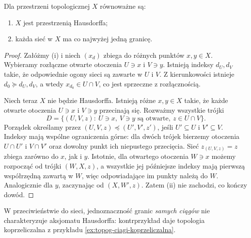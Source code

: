 \begin{twierdzenie}
\label{thm:topog-sieci-hausdorff}
Dla przestrzeni topologicznej $X$ równoważne są:
\begin{enumerate}[label=(\roman*)]
\item $X$ jest przestrzenią Hausdorffa;
\item każda sieć w $X$ ma co najwyżej jedną granicę.
\end{enumerate}
\end{twierdzenie}
\begin{proof}
Załóżmy (i) i niech $(x_d)$ zbiega do różnych
punktów $x,y\in X$. Wybieramy rozłączne otwarte
otoczenia $U\ni x$ i $V\ni y$. Istnieją indeksy
$d_U,d_V$ takie, że odpowiednie ogony sieci są
zawarte w $U$ i $V$. Z kierunkowości istnieje
$d_0\succeq d_U,d_V$, a wtedy $x_{d_0}\in U\cap V$,
co jest sprzeczne z rozłącznością.

Niech teraz $X$ nie będzie Hausdorffa. Istnieją różne
$x,y\in X$ takie, że każde otwarte otoczenia
$U\ni x$ i $V\ni y$ przecinają się.
Rozważmy wszystkie trójki
\[
 D=\{(U,V,z):\ U\ni x,\ V\ni y\text{ są otwarte},
                                 \ z\in U\cap V\}.
\]
Porządek określamy przez
$(U,V,z)\preceq(U',V',z')$, jeśli
$U'\subseteq U$ i $V'\subseteq V$.
Indeksy mają wspólne ograniczenia górne: dla dwóch
trójek bierzemy otoczenia $U\cap U'$ i $V\cap V'$
oraz dowolny punkt ich niepustego przecięcia.
Sieć $z_{(U,V,z)}=z$ zbiega zarówno do $x$, jak i $y$.
Istotnie, dla otwartego otoczenia $W\ni x$
możemy rozpocząć od trójki $(W,X,z)$,
a wszystkie jej późniejsze indeksy mają pierwszą
współrzędną zawartą w $W$, więc odpowiadające im
punkty należą do $W$. Analogicznie dla $y$,
zaczynając od $(X,W',z)$.
Zatem (ii) nie zachodzi, co kończy dowód.
\end{proof}

\begin{uwaga}
W przeciwieństwie do sieci, jednoznaczność granic
\emph{samych ciągów} nie charakteryzuje aksjomatu
Hausdorffa: kontrprzykład daje topologia koprzeliczalna
z przykładu \ref{ex:topog-ciagi-koprzeliczalna}.
\end{uwaga}

